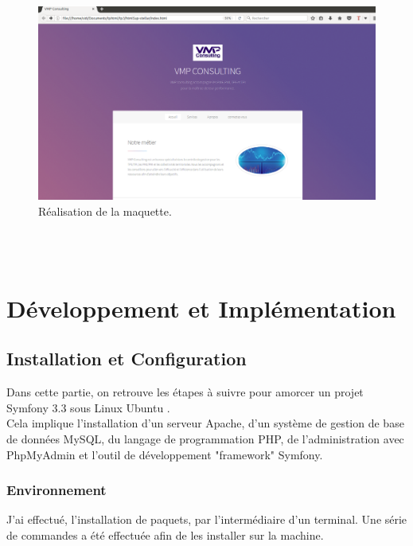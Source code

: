 \documentclass[12pt]{article}
\begin{document}
 \\
 \\

\begin{center}
\begin{figure}[htp]
  \centering
  \includegraphics[width=12cm]{design1.png}
  \caption{Réalisation de la maquette.}
  \label{fig:une-autre-image}
\end{figure}
\end{center}

\\ \\ 


\newpage

\section{Développement et Implémentation}

\subsection{Installation et Configuration}
Dans cette partie, on retrouve  les étapes à suivre pour amorcer un  projet Symfony 3.3 sous Linux Ubuntu .\\
 Cela implique l'installation d'un serveur Apache, d'un système de gestion de base de données MySQL, du langage de programmation PHP, de l'administration avec PhpMyAdmin et l'outil de développement "framework" Symfony.\\ 


\subsubsection{Environnement}
J'ai effectué, l'installation de paquets, par l'intermédiaire d'un terminal. Une série de commandes a été effectuée afin de les installer sur la machine.
\\
\end{document}
